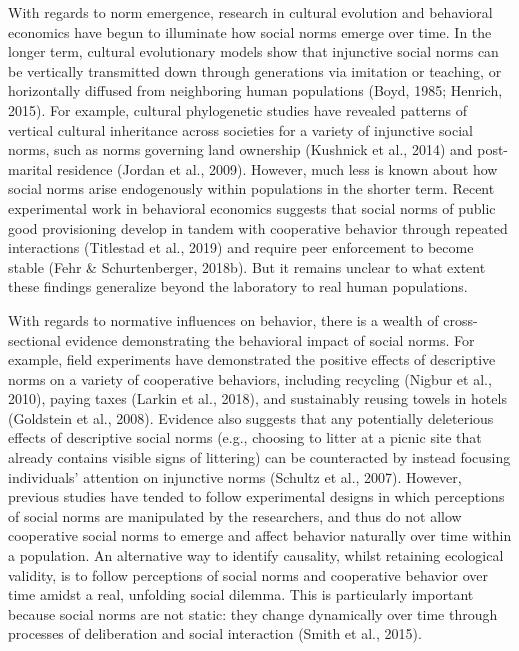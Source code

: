 \documentclass[
  english,
  man,floatsintext]{apa6}
\begin{document}
With regards to norm emergence, research in cultural evolution and behavioral economics have begun to illuminate how social norms emerge over time. In the longer term, cultural evolutionary models show that injunctive social norms can be vertically transmitted down through generations via imitation or teaching, or horizontally diffused from neighboring human populations (Boyd, 1985; Henrich, 2015). For example, cultural phylogenetic studies have revealed patterns of vertical cultural inheritance across societies for a variety of injunctive social norms, such as norms governing land ownership (Kushnick et al., 2014) and post-marital residence (Jordan et al., 2009). However, much less is known about how social norms arise endogenously within populations in the shorter term. Recent experimental work in behavioral economics suggests that social norms of public good provisioning develop in tandem with cooperative behavior through repeated interactions (Titlestad et al., 2019) and require peer enforcement to become stable (Fehr \& Schurtenberger, 2018b). But it remains unclear to what extent these findings generalize beyond the laboratory to real human populations.

With regards to normative influences on behavior, there is a wealth of cross-sectional evidence demonstrating the behavioral impact of social norms. For example, field experiments have demonstrated the positive effects of descriptive norms on a variety of cooperative behaviors, including recycling (Nigbur et al., 2010), paying taxes (Larkin et al., 2018), and sustainably reusing towels in hotels (Goldstein et al., 2008). Evidence also suggests that any potentially deleterious effects of descriptive social norms (e.g., choosing to litter at a picnic site that already contains visible signs of littering) can be counteracted by instead focusing individuals' attention on injunctive norms (Schultz et al., 2007). However, previous studies have tended to follow experimental designs in which perceptions of social norms are manipulated by the researchers, and thus do not allow cooperative social norms to emerge and affect behavior naturally over time within a population. An alternative way to identify causality, whilst retaining ecological validity, is to follow perceptions of social norms and cooperative behavior over time amidst a real, unfolding social dilemma. This is particularly important because social norms are not static: they change dynamically over time through processes of deliberation and social interaction (Smith et al., 2015).
\end{document}
